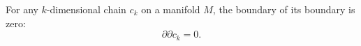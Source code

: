 For any $k$-dimensional chain $c_k$ on a manifold $M$, the boundary of its boundary is zero:
$$\partial \partial c_k = 0.$$
